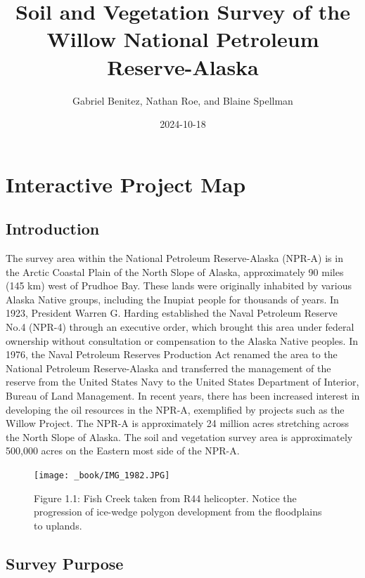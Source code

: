 \documentclass[
]{book}
\title{Soil and Vegetation Survey of the Willow National Petroleum Reserve-Alaska}
\author{Gabriel Benitez, Nathan Roe, and Blaine Spellman}
\date{2024-10-18}
\theoremstyle{definition}
\theoremstyle{definition}
\theoremstyle{definition}
\theoremstyle{definition}
\theoremstyle{remark}
\begin{document}
\maketitle

{
\setcounter{tocdepth}{1}
\tableofcontents
}
\hypertarget{interactive-project-map}{%
\chapter{Interactive Project Map}\label{interactive-project-map}}

\hypertarget{introduction}{%
\section{Introduction}\label{introduction}}

The survey area within the National Petroleum Reserve-Alaska (NPR-A) is in the Arctic Coastal Plain of the North Slope of Alaska, approximately 90 miles (145 km) west of Prudhoe Bay. These lands were originally inhabited by various Alaska Native groups, including the Inupiat people for thousands of years. In 1923, President Warren G. Harding established the Naval Petroleum Reserve No.4 (NPR-4) through an executive order, which brought this area under federal ownership without consultation or compensation to the Alaska Native peoples. In 1976, the Naval Petroleum Reserves Production Act renamed the area to the National Petroleum Reserve-Alaska and transferred the management of the reserve from the United States Navy to the United States Department of Interior, Bureau of Land Management. In recent years, there has been increased interest in developing the oil resources in the NPR-A, exemplified by projects such as the Willow Project. The NPR-A is approximately 24 million acres stretching across the North Slope of Alaska. The soil and vegetation survey area is approximately 500,000 acres on the Eastern most side of the NPR-A.

\begin{figure}
\centering
\texttt{[image: \_book/IMG\_1982.JPG]}
\caption{Figure 1.1: Fish Creek taken from R44 helicopter. Notice the progression of ice-wedge polygon development from the floodplains to uplands.}
\end{figure}

\hypertarget{survey-purpose}{%
\section{Survey Purpose}\label{survey-purpose}}
\end{document}
